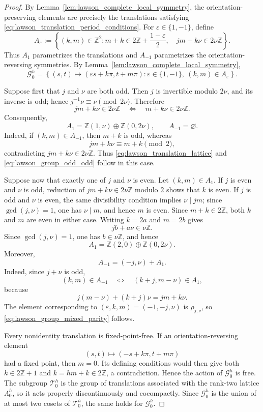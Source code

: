 \documentclass[a4paper,11pt]{amsart}
\numberwithin{equation}{section}
\theoremstyle{plain}
\begin{document}
\begin{proof}
By Lemma~\ref{lem:lawson_complete_local_symmetry}, the
orientation-preserving elements are precisely the translations satisfying
\eqref{eq:lawson_translation_period_conditions}. For
$\varepsilon\in\{1,-1\}$, define
\[
A_\varepsilon
:=
\left\{
(k,m)\in\mathbb Z^2:
 m+k\in2\mathbb Z+\frac{1-\varepsilon}{2},
\quad
jm+k\nu\in2\nu\mathbb Z
\right\}.
\]
Thus $A_1$ parametrizes the translations and $A_{-1}$ parametrizes the
orientation-reversing symmetries. By
Lemma~\ref{lem:lawson_complete_local_symmetry},
\[
\mathcal G_0^h
=
\left\{
(s,t)\longmapsto(\varepsilon s+k\pi,t+m\pi):
\varepsilon\in\{1,-1\},\ (k,m)\in A_\varepsilon
\right\}.
\]

Suppose first that $j$ and $\nu$ are both odd. Then $j$ is invertible
modulo $2\nu$, and its inverse is odd; hence
$j^{-1}\nu\equiv\nu\pmod{2\nu}$. Therefore
\[
jm+k\nu\in2\nu\mathbb Z
\quad\Longleftrightarrow\quad
m+k\nu\in2\nu\mathbb Z.
\]
Consequently,
\[
A_1
=
\mathbb Z(1,\nu)\oplus\mathbb Z(0,2\nu),
\qquad
A_{-1}=\varnothing.
\]
Indeed, if $(k,m)\in A_{-1}$, then $m+k$ is odd, whereas
\[
jm+k\nu\equiv m+k\pmod2,
\]
contradicting $jm+k\nu\in2\nu\mathbb Z$. Thus
\eqref{eq:lawson_translation_lattice} and
\eqref{eq:lawson_group_odd_odd} follow in this case.

Suppose now that exactly one of $j$ and $\nu$ is even. Let
$(k,m)\in A_1$. If $j$ is even and $\nu$ is odd, reduction of
$jm+k\nu\in2\nu\mathbb Z$ modulo $2$ shows that $k$ is even. If $j$
is odd and $\nu$ is even, the same divisibility condition implies
$\nu\mid jm$; since $\gcd(j,\nu)=1$, one has $\nu\mid m$, and hence
$m$ is even. Since $m+k\in2\mathbb Z$, both $k$ and $m$ are even in
either case. Writing $k=2a$ and $m=2b$ gives
\[
jb+a\nu\in\nu\mathbb Z.
\]
Since $\gcd(j,\nu)=1$, one has $b\in\nu\mathbb Z$, and hence
\[
A_1
=
\mathbb Z(2,0)\oplus\mathbb Z(0,2\nu).
\]
Moreover,
\[
A_{-1}=(-j,\nu)+A_1.
\]
Indeed, since $j+\nu$ is odd,
\[
(k,m)\in A_{-1}
\quad\Longleftrightarrow\quad
(k+j,m-\nu)\in A_1,
\]
because
\[
j(m-\nu)+(k+j)\nu=jm+k\nu.
\]
The element corresponding to $(\varepsilon,k,m)=(-1,-j,\nu)$ is
$\rho_{j,\nu}$, so
\eqref{eq:lawson_group_mixed_parity} follows.

Every nonidentity translation is fixed-point-free. If an
orientation-reversing element
\[
(s,t)\longmapsto(-s+k\pi,t+m\pi)
\]
had a fixed point, then $m=0$. Its defining conditions would then give
both $k\in2\mathbb Z+1$ and $k=hm+k\in2\mathbb Z$, a contradiction.
Hence the action of $\mathcal G_0^h$ is free. The subgroup $\mathcal T_0^h$ is the group of translations associated
with the rank-two lattice $\Lambda_0^h$, so it acts properly discontinuously
and cocompactly. Since $\mathcal G_0^h$ is the union of at most two cosets
of $\mathcal T_0^h$, the same holds for $\mathcal G_0^h$.


\end{proof}
\end{document}
